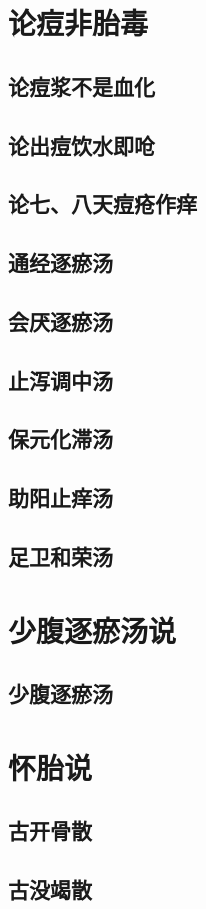\documentclass[a4paper,12pt,UTF8,twoside]{ctexbook}
\begin{document}
	\chapter{论痘非胎毒}
	\section{论痘浆不是血化}
	\section{论出痘饮水即呛}
	\section{论七、八天痘疮作痒}
	\section{通经逐瘀汤}
	\section{会厌逐瘀汤}
	\section{止泻调中汤}
	\section{保元化滞汤}
	\section{助阳止痒汤}
	\section{足卫和荣汤}
	\chapter{少腹逐瘀汤说}
	\section{少腹逐瘀汤}
	\chapter{怀胎说}
	\section{古开骨散}
	\section{古没竭散}
\end{document}
